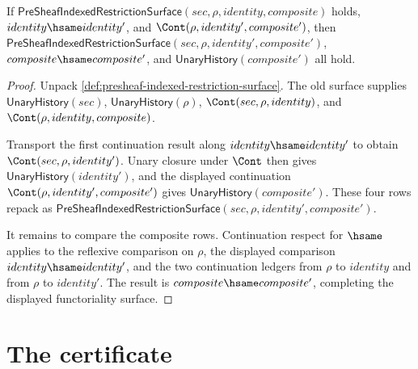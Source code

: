 \begin{theorem}\label{thm:presheaf-indexed-restriction-functoriality-surface}
If $\mathsf{PreSheafIndexedRestrictionSurface}(sec,\rho,identity,composite)$ holds, $identity\hsame identity'$, and $\Cont(\rho,identity',composite')$, then $\mathsf{PreSheafIndexedRestrictionSurface}(sec,\rho,identity',composite')$, $composite\hsame composite'$, and $\mathsf{UnaryHistory}(composite')$ all hold.
\end{theorem}
\begin{proof}
Unpack \autoref{def:presheaf-indexed-restriction-surface}. The old surface supplies $\mathsf{UnaryHistory}(sec)$, $\mathsf{UnaryHistory}(\rho)$, $\Cont(sec,\rho,identity)$, and $\Cont(\rho,identity,composite)$.

Transport the first continuation result along $identity\hsame identity'$ to obtain $\Cont(sec,\rho,identity')$. Unary closure under $\Cont$ then gives $\mathsf{UnaryHistory}(identity')$, and the displayed continuation $\Cont(\rho,identity',composite')$ gives $\mathsf{UnaryHistory}(composite')$. These four rows repack as $\mathsf{PreSheafIndexedRestrictionSurface}(sec,\rho,identity',composite')$.

It remains to compare the composite rows. Continuation respect for $\hsame$ applies to the reflexive comparison on $\rho$, the displayed comparison $identity\hsame identity'$, and the two continuation ledgers from $\rho$ to $identity$ and from $\rho$ to $identity'$. The result is $composite\hsame composite'$, completing the displayed functoriality surface.
\end{proof}

\section{The certificate}
\label{sec:presheaf-certificate}

